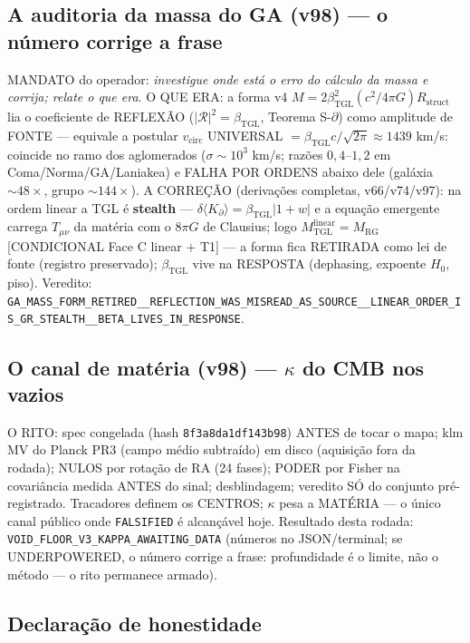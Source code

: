\documentclass[11pt]{article}
\newcommand{\bTGL}{\beta_{\mathrm{TGL}}}\newcommand{\Msun}{M_{\odot}}\newcommand{\TGL}{\mathrm{TGL}}
\theoremstyle{definition}\newtheorem{deriv}{Derivação}
\begin{document}
\subsection*{A auditoria da massa do GA (v98) --- o número corrige a frase}

MANDATO do operador: \emph{investigue onde está o erro do cálculo da massa e corrija; relate o que era}. O QUE ERA: a forma v4 $M=2\bTGL^2(c^2/4\pi G)R_{\mathrm{struct}}$ lia o coeficiente de REFLEXÃO ($|\mathcal R|^2=\bTGL$, Teorema S-$\partial$) como amplitude de FONTE --- equivale a postular $v_{\mathrm{circ}}$ UNIVERSAL $=\bTGL c/\sqrt{2\pi}\approx1439$ km/s: coincide no ramo dos aglomerados ($\sigma\sim10^3$ km/s; razões $0{,}4$--$1{,}2$ em Coma/Norma/GA/Laniakea) e FALHA POR ORDENS abaixo dele (galáxia $\sim48\times$, grupo $\sim144\times$). A CORREÇÃO (derivações completas, v66/v74/v97): na ordem linear a TGL é \textbf{stealth} --- $\delta\langle K_\partial\rangle=\bTGL|1+w|$ e a equação emergente carrega $T_{\mu\nu}$ da matéria com o $8\pi G$ de Clausius; logo $M_{\mathrm{TGL}}^{\mathrm{linear}}=M_{\mathrm{RG}}$ [CONDICIONAL Face C linear $+$ T1] --- a forma fica RETIRADA como lei de fonte (registro preservado); $\bTGL$ vive na RESPOSTA (dephasing, expoente $H_0$, piso). Veredito: \texttt{GA\_MASS\_FORM\_RETIRED\_\_REFLECTION\_WAS\_MISREAD\_AS\_SOURCE\_\_LINEAR\_ORDER\_IS\_GR\_STEALTH\_\_BETA\_LIVES\_IN\_RESPONSE}.

\subsection*{O canal de matéria (v98) --- $\kappa$ do CMB nos vazios}

O RITO: spec congelada (hash \texttt{8f3a8da1df143b98}) ANTES de tocar o mapa; klm MV do Planck PR3 (campo médio subtraído) em disco (aquisição fora da rodada); NULOS por rotação de RA (24 fases); PODER por Fisher na covariância medida ANTES do sinal; desblindagem; veredito SÓ do conjunto pré-registrado. Tracadores definem os CENTROS; $\kappa$ pesa a MATÉRIA --- o único canal público onde \texttt{FALSIFIED} é alcançável hoje. Resultado desta rodada: \texttt{VOID\_FLOOR\_V3\_KAPPA\_AWAITING\_DATA} (números no JSON/terminal; se UNDERPOWERED, o número corrige a frase: profundidade é o limite, não o método --- o rito permanece armado).

\subsection*{Declaração de honestidade}
\end{document}
